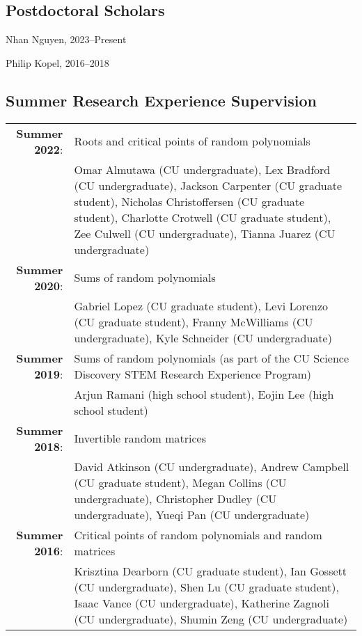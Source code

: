 \documentclass[letterpaper]{article}
\renewenvironment{itemize}{
  \begin{list}{}{
    \setlength{\leftmargin}{1em}
  }
}{
  \end{list}
}
\begin{document}

\subsection*{Postdoctoral Scholars}
\begin{itemize}
	\item Nhan Nguyen, 2023--Present
	\item Philip Kopel, 2016--2018
\end{itemize}

\subsection*{Summer Research Experience Supervision}
   \begin{tabular}{r p{4.65in}}
   {\bf Summer 2022}: & Roots and critical points of random polynomials \\
   & Omar Almutawa (CU undergraduate), Lex Bradford (CU undergraduate), Jackson Carpenter (CU graduate student), Nicholas Christoffersen (CU graduate student), Charlotte Crotwell (CU graduate student),  Zee Culwell (CU undergraduate), Tianna Juarez (CU undergraduate) \\
   {\bf Summer 2020}: & Sums of random polynomials \\
   & Gabriel Lopez (CU graduate student), Levi Lorenzo (CU graduate student), Franny McWilliams (CU undergraduate), Kyle Schneider (CU undergraduate) \\
   {\bf Summer 2019}: & Sums of random polynomials (as part of the CU Science Discovery STEM Research Experience Program) \\
   & Arjun Ramani (high school student), Eojin Lee (high school student) \\
   {\bf Summer 2018}: & Invertible random matrices \\
   & David Atkinson (CU undergraduate), Andrew Campbell (CU graduate student), Megan Collins (CU undergraduate), Christopher Dudley (CU undergraduate), Yueqi Pan (CU undergraduate) \\
   {\bf Summer 2016}: & Critical points of random polynomials and random matrices \\
   & Krisztina Dearborn (CU graduate student), Ian Gossett (CU undergraduate), Shen Lu  (CU graduate student), Isaac Vance (CU undergraduate), Katherine Zagnoli (CU undergraduate), Shumin Zeng (CU undergraduate)
   \end{tabular}
   
\end{document}
